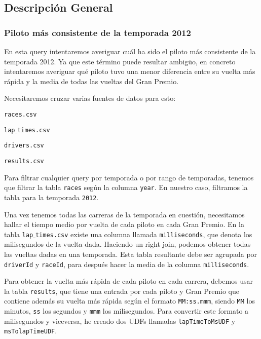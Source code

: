 \documentclass[12pt,twoside,titlepage]{report}
\begin{document}
\subsection{Descripción General}

\subsubsection{Piloto más consistente de la temporada 2012}
En esta query intentaremos averiguar cuál ha sido el piloto más consistente de la temporada 2012. Ya que este término puede resultar ambigüo, en concreto intentaremos averiguar qué piloto tuvo una menor diferencia entre su vuelta más rápida y la media de todas las vueltas del Gran Premio.

Necesitaremos cruzar varias fuentes de datos para esto: 

\begin{compactitem}
  \item \texttt{races.csv}
  \item \texttt{lap$\_$times.csv}
  \item \texttt{drivers.csv}
  \item \texttt{results.csv}
\end{compactitem}

Para filtrar cualquier query por temporada o por rango de temporadas, tenemos que filtrar la tabla \texttt{races} según la columna \texttt{year}. En nuestro caso, filtramos la tabla para la temporada \texttt{2012}.

Una vez tenemos todas las carreras de la temporada en cuestión, necesitamos hallar el tiempo medio por vuelta de cada piloto en cada Gran Premio. En la tabla \texttt{lap$\_$times.csv} existe una columna llamada \texttt{milliseconds}, que denota los milisegundos de la vuelta dada. Haciendo un right join, podemos obtener todas las vueltas dadas en una temporada. Esta tabla resultante debe ser agrupada por \texttt{driverId} y \texttt{raceId}, para después hacer la media de la columna \texttt{milliseconds}.

Para obtener la vuelta más rápida de cada piloto en cada carrera, debemos usar la tabla \texttt{results}, que tiene una entrada por cada piloto y Gran Premio que contiene además su vuelta más rápida según el formato \texttt{MM:ss.mmm}, siendo \texttt{MM} los minutos, \texttt{ss} los segundos y \texttt{mmm} los milisegundos. Para convertir este formato a milisegundos y viceversa, he creado dos UDFs llamadas \texttt{lapTimeToMsUDF} y \texttt{msTolapTimeUDF}.
\end{document}
